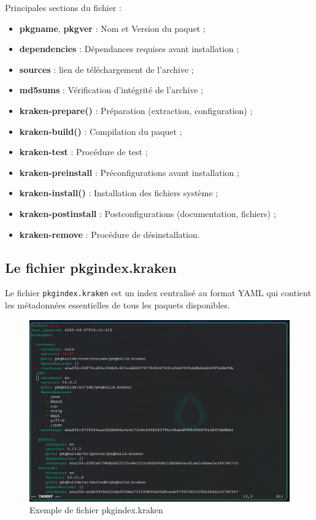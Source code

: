 Principales sections du fichier :
\begin{itemize}
    \item \textbf{pkgname}, \textbf{pkgver} : Nom et Version  du paquet ;
    \item \textbf{dependencies} : Dépendances requises avant installation ;
    \item \textbf{sources} : lien de téléchargement de l'archive ;
    \item \textbf{md5sums} : Vérification d'intégrité de l'archive ;
    \item \textbf{kraken-prepare()} : Préparation (extraction, configuration) ;
    \item \textbf{kraken-build()} : Compilation du paquet ;
    \item \textbf{kraken-test} : Procédure de test ;
    \item \textbf{kraken-preinstall} : Préconfigurations avant installation ;
    \item \textbf{kraken-install()} : Installation des fichiers système ;
    \item \textbf{kraken-postinstall} : Postconfigurations (documentation, fichiers) ;
    \item \textbf{kraken-remove} : Procédure de désinstallation.
\end{itemize}

\subsection{Le fichier pkgindex.kraken}
\label{subsubsec:pkgindex}
Le fichier \texttt{pkgindex.kraken} est un index centralisé au format YAML qui contient les métadonnées essentielles de tous les paquets disponibles.
\begin{figure}[H]
  \centering
  \includegraphics[width=1\textwidth]{images_pfe/pkgindekrakenpkgindex.png}
  \caption{Exemple de fichier pkgindex.kraken}
  \label{fig:pkgindex-example}
\end{figure}

